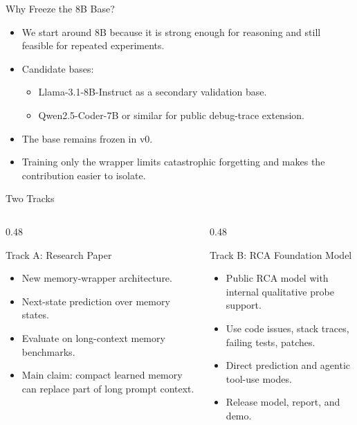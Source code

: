 \begin{frame}{Why Freeze the 8B Base?}
  \begin{itemize}
    \item We start around 8B because it is strong enough for reasoning and still feasible for repeated experiments.
    \item Candidate bases:
      \begin{itemize}
        \item Llama-3.1-8B-Instruct as a secondary validation base.
        \item Qwen2.5-Coder-7B or similar for public debug-trace extension.
      \end{itemize}
    \item The base remains frozen in v0.
    \item Training only the wrapper limits catastrophic forgetting and makes the contribution easier to isolate.
  \end{itemize}
\end{frame}

\begin{frame}{Two Tracks}
  \begin{columns}[T]
    \begin{column}{0.48\textwidth}
      \begin{block}{Track A: Research Paper}
        \begin{itemize}
          \item New memory-wrapper architecture.
          \item Next-state prediction over memory states.
          \item Evaluate on long-context memory benchmarks.
          \item Main claim: compact learned memory can replace part of long prompt context.
        \end{itemize}
      \end{block}
    \end{column}
    \begin{column}{0.48\textwidth}
      \begin{block}{Track B: RCA Foundation Model}
        \begin{itemize}
          \item Public RCA model with internal qualitative probe support.
          \item Use code issues, stack traces, failing tests, patches.
          \item Direct prediction and agentic tool-use modes.
          \item Release model, report, and demo.
        \end{itemize}
      \end{block}
    \end{column}
  \end{columns}
\end{frame}

